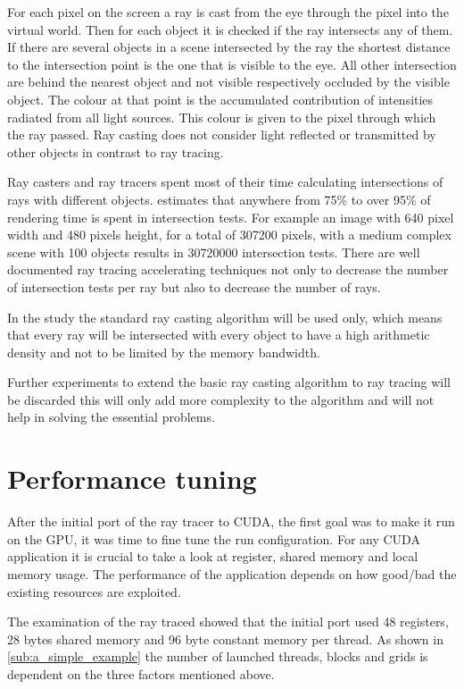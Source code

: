 For each pixel on the screen a ray is cast from the eye through the pixel into
the virtual world. Then for each object it is checked if the ray intersects any
of them. If there are several objects in a scene intersected by the ray the
shortest distance to the intersection point is the one that is visible to the
eye. All other intersection are behind the nearest object and not visible
respectively occluded by the visible object. The colour at that point is the
accumulated contribution of intensities radiated from all light sources. This
colour is given to the pixel through which the ray passed. Ray casting does not
consider light reflected or transmitted by other objects in contrast to ray
tracing.

Ray casters and ray tracers spent most of their time calculating intersections
of rays with different objects. \citeauthor{citeulike:3770900}
\citep{citeulike:3770900} estimates that anywhere from 75\% to over 95\% of
rendering time is spent in intersection tests. For example an image with 640
pixel width and 480 pixels height, for a total of 307200 pixels, with a medium
complex scene with 100 objects results in 30720000 intersection tests. There are
well documented ray tracing accelerating techniques not only to decrease the
number of intersection tests per ray but also to decrease the number of rays.

In the study the standard ray casting algorithm will be used only, which means
that every ray will be intersected with every object to have a high arithmetic
density and not to be limited by the memory bandwidth.

Further experiments to extend the basic ray casting algorithm to ray tracing 
will be discarded this will only add more complexity to the algorithm and will
not help in solving the essential problems. 

\section{Performance tuning} %
\label{sec:performance_tuning}

After the initial port of the ray tracer to \gls{CUDA}, the first goal was to 
make it run on the \gls{GPU}, it was time to fine tune the run configuration. 
For any \gls{CUDA} application it is crucial to take a look at register, shared 
memory and local memory usage. The performance of the application  depends on
how good/bad the existing resources are exploited.

The examination of the ray traced showed that the initial port used 48
registers, 28 bytes shared memory and 96 byte constant memory per thread. As
shown in \autoref{sub:a_simple_example} the number of launched
threads, blocks and grids is dependent on the three factors mentioned above.

